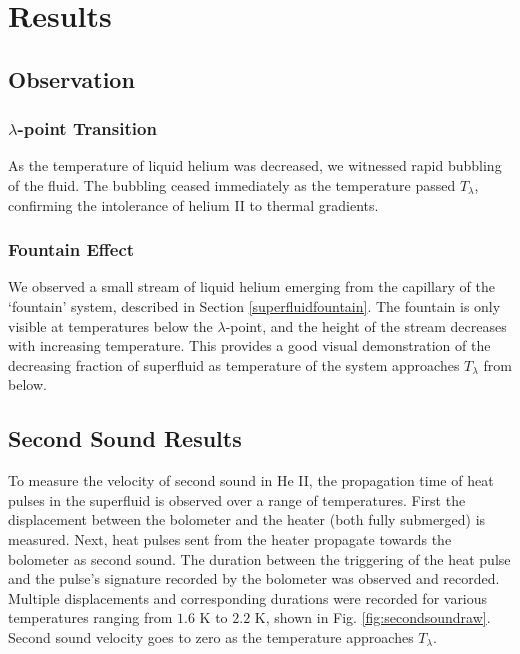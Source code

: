 
\section{Results}
\label{results}

\subsection{Observation}
\subsubsection{$\lambda$-point Transition}
As the temperature of liquid helium was decreased, we witnessed rapid
bubbling of the fluid. The bubbling ceased immediately as the
temperature passed $T_{\lambda}$, confirming the intolerance of helium
II to thermal gradients.

\subsubsection{Fountain Effect}
We observed a small stream of liquid helium emerging from the
capillary of the `fountain' system, described in Section
\ref{superfluidfountain}. The fountain is only visible at temperatures
below the $\lambda$-point, and the height of the stream decreases with
increasing temperature. This provides a good visual demonstration of
the decreasing fraction of superfluid as temperature of the system
approaches $T_{\lambda}$ from below.

\subsection{Second Sound Results}
\label{secondsoundresults}

To measure the velocity of second sound in He II, the propagation time of heat pulses in the superfluid is observed over a range of temperatures. First the displacement between the bolometer and the heater (both fully submerged) is measured. Next, heat pulses sent from the heater propagate towards the bolometer as second sound. The duration between the triggering of the heat pulse and the pulse's signature recorded by the bolometer was observed and recorded. Multiple displacements and corresponding durations were recorded for various temperatures ranging from $1.6$ K to $2.2$ K, shown in Fig. \ref{fig:secondsoundraw}. Second sound velocity goes to zero as the temperature approaches $T_{\lambda}$.



